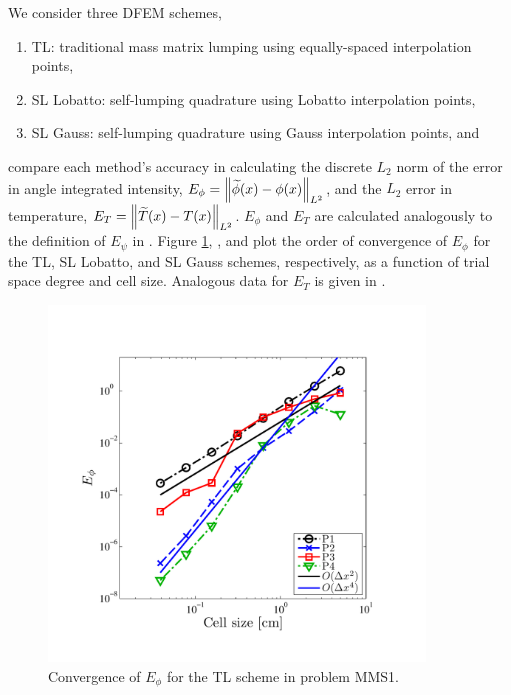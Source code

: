 We consider three DFEM schemes,
\begin{enumerate}
\item TL: traditional mass matrix lumping using equally-spaced interpolation points,
\item SL Lobatto: self-lumping quadrature using Lobatto interpolation points,
\item SL Gauss: self-lumping quadrature using Gauss interpolation points, and
\end{enumerate}  
compare each method's accuracy in calculating the discrete $L_2$ norm of the error in angle integrated intensity, $E_{\phi} = \left\lVert  \widetilde{\phi}(x) - \phi(x) \right\rVert_{L^2}$, and the $L_2$ error in temperature, $E_T = \left\lVert  \widetilde{T}(x) - T(x)  \right\rVert_{L^2}$.
$E_{\phi}$ and $E_{T}$ are calculated analogously to the definition of $E_{\psi}$ in .
Figure \ref{fig:mms1_tl_phi}, , and  plot the order of convergence of $E_{\phi}$ for the TL, SL Lobatto, and SL Gauss schemes, respectively, as a function of trial space degree and cell size.
Analogous data for $E_{T}$ is given in .
%
\begin{figure}[!htp]
\centering
\includegraphics[width=10cm,trim=0.25in  0.5in 0.75in 0.75in,clip=true]{chapter6_grey_radtran/Dissertation_Data/MMS2_TL_phi_L2.pdf}
\caption{Convergence of $E_{\phi}$ for the TL scheme in problem MMS1.}
\label{fig:mms1_tl_phi}
\end{figure}
%
%
